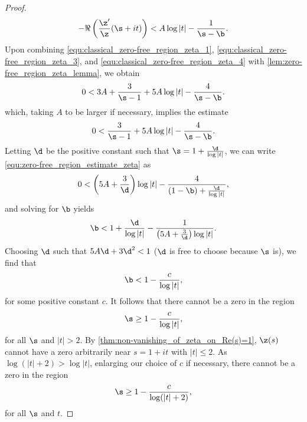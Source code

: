 \begin{proof}
        \begin{equation}\label{equ:classical_zero-free_region_zeta_4}
          -\Re\left(\frac{\z'}{\z}(\s+it)\right) < A\log|t|-\frac{1}{\s-\b}.
        \end{equation}
        Upon combining \cref{equ:classical_zero-free_region_zeta_1}, \cref{equ:classical_zero-free_region_zeta_3}, and \cref{equ:classical_zero-free_region_zeta_4} with \cref{lem:zero-free_region_zeta_lemma}, we obtain
        \[
          0 < 3A+\frac{3}{\s-1}+5A\log|t|-\frac{4}{\s-\b}.
        \]
        which, taking $A$ to be larger if necessary, implies the estimate
        \begin{equation}\label{equ:zero-free_region_estimate_zeta}
          0 < \frac{3}{\s-1}+5A\log|t|-\frac{4}{\s-\b}.
        \end{equation}
        Letting $\d$ be the positive constant such that $\s = 1+\frac{\d}{\log|t|}$, we can write \cref{equ:zero-free_region_estimate_zeta} as
        \[
          0 < \left(5A+\frac{3}{\d}\right)\log|t|-\frac{4}{(1-\b)+\frac{\d}{\log|t|}},
        \]
        and solving for $\b$ yields
        \[
          \b < 1+\frac{\d}{\log|t|}-\frac{1}{\left(5A+\frac{3}{\d}\right)\log|t|}.
        \]
        Choosing $\d$ such that $5A\d+3\d^{2} < 1$ ($\d$ is free to choose because $\s$ is), we find that
        \[
          \b < 1-\frac{c}{\log|t|},
        \]
        for some positive constant $c$. It follows that there cannot be a zero in the region
        \[
          \s \ge 1-\frac{c}{\log|t|},
        \]
        for all $\s$ and $|t| > 2$. By \cref{thm:non-vanishing_of_zeta_on_Re(s)=1}, $\z(s)$ cannot have a zero arbitrarily near $s = 1+it$ with $|t| \le 2$. As $\log(|t|+2) > \log|t|$, enlarging our choice of $c$ if necessary, there cannot be a zero in the region
        \[
          \s \ge 1-\frac{c}{\log(|t|+2)},
        \]
        for all $\s$ and $t$.
      \end{proof}
  
